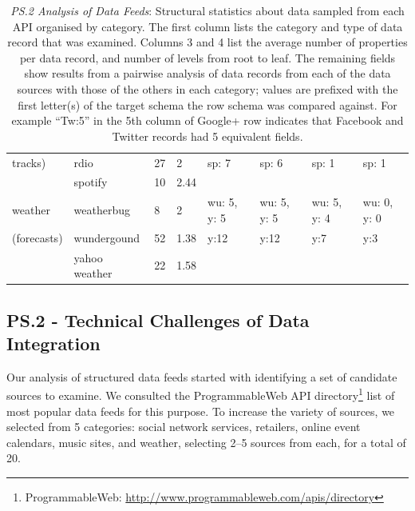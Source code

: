 \documentclass{sigchi}
\begin{document}
\begin{table}[htb]
\begin{tabular}{p{2.0cm}  p{1.8cm}  p{1.8cm}  p{1.8cm}  p{1.8cm}  p{1.8cm}  p{1.8cm}  p{1.8cm}}
tracks)			& rdio			& 27						& 2						& sp: 7			& sp: 6					& sp: 1					& sp: 1 \\
				& spotify			& 10						& 2.44					&				&						&						& \\
\hline
weather			& weatherbug		& 8						& 2						& wu: 5, y: 5		& wu: 5, y: 5				& wu: 5, y: 4				& wu: 0, y: 0 \\
(forecasts)		& wundergound	& 52						& 1.38					& y:12			& y:12					& y:7						& y:3 \\
				& yahoo weather	& 22						& 1.58					&				&						&						& \\
\end{tabular}
\caption{\emph{PS.2 Analysis of Data Feeds}: Structural statistics about data sampled from each API organised by category.  The first column lists the category and type of data record that was examined.  Columns 3 and 4 list the average number of properties per data record, and number of levels from root to leaf. The remaining fields show results from a pairwise analysis of data records from each of the data sources with those of the others in each category; values are prefixed with the first letter(s) of the target schema the row schema was compared against. For example ``Tw:5'' in the 5th column of Google+ row indicates that Facebook and Twitter records had 5 equivalent fields. }\label{tbl:prestudy2}
\end{table}


\subsection{PS.2 - Technical Challenges of Data Integration}
Our analysis of structured data feeds started with identifying a set of candidate sources to examine.  We consulted the ProgrammableWeb API directory\footnote{ProgrammableWeb: \url{http://www.programmableweb.com/apis/directory}} list of most popular data feeds for this purpose.  To increase the variety of sources, we selected from 5 categories: social network services, retailers, online event calendars, music sites, and weather, selecting 2--5 sources from each, for a total of 20.  
\end{document}

